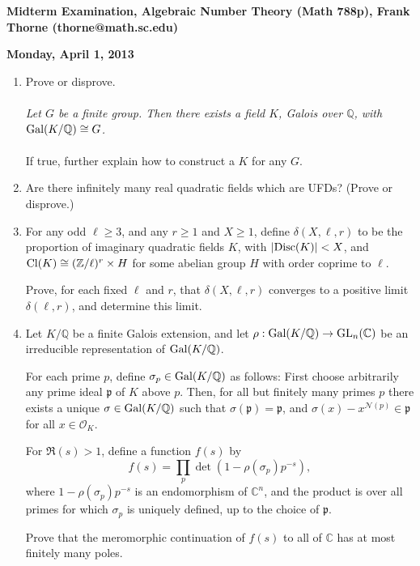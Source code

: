 \documentclass[12pt]{article}
\newcommand{\Gal}{{\text {\rm Gal}}}
\newcommand{\Disc}{{\text {\rm Disc}}}
\newcommand{\GL}{{\text {\rm GL}}}
\newcommand{\Cl}{{\text {\rm Cl}}}
\newcommand{\Q}{\mathbb{Q}}
\newcommand{\Z}{\mathbb{Z}}
\newcommand{\C}{\mathbb{C}}
\newcommand{\mfp}{\mathfrak{p}}
\newcommand{\calN}{\mathcal{N}}
\begin{document}
\setlength{\topmargin}{-2mm}





\begin{center}{\bf Midterm Examination, Algebraic Number Theory (Math 788p), Frank Thorne (thorne@math.sc.edu)}
\end{center}
\begin{center}
{\bf Monday, April 1, 2013}
\end{center}

\begin{enumerate}[(1)]
\item
Prove or disprove.
\\
\\
{\itshape Let $G$ be a finite group. Then there exists a field $K$, Galois over $\Q$, with $\Gal(K/\Q) \cong G$.}
\\
\\
If true, further explain how to construct a $K$ for any $G$.
\vskip 0.5in
\item
Are there infinitely many real quadratic fields which are UFDs? (Prove or disprove.)
\vskip 0.5in
\item
For any odd $\ell \geq 3$, and any $r \geq 1$ and $X \geq 1$, define $\delta(X, \ell, r)$ to be the proportion
of imaginary quadratic fields $K$, with $|\Disc(K)| < X$, and $\Cl(K) \cong (\Z/\ell)^r \times H$
for some abelian group $H$ with order coprime to $\ell$.

Prove, for each fixed $\ell$ and $r$, that $\delta(X, \ell, r)$ converges to a positive 
limit $\delta(\ell, r)$, and determine this limit.
\vskip 0.5in
\item
Let $K/\Q$ be a finite Galois extension, and let $\rho: \Gal(K/\Q) \rightarrow \GL_n(\C)$ be an irreducible
representation of $\Gal(K/\Q)$.

For each prime $p$, define $\sigma_p \in \Gal(K/\Q)$ as follows: First choose arbitrarily any prime ideal $\mfp$
of $K$ above $p$. Then, for all but finitely many primes $p$ there exists a unique $\sigma \in \Gal(K/\Q)$ such that
$\sigma(\mfp) = \mfp$, and $\sigma(x) - x^{\calN(p)} \in \mfp$ for all $x \in \mathcal{O}_K$.

For $\Re(s) > 1$, define a function $f(s)$ by
\[ f(s) = \prod_p \det(1 - \rho(\sigma_p) p^{-s}),
\]
where $1 - \rho(\sigma_p) p^{-s}$ is an endomorphism of $\C^n$, and the product is over all primes for which $\sigma_p$ is uniquely
defined, up to the choice of $\mfp$.

Prove that the meromorphic continuation of $f(s)$ to all of $\C$ has at most finitely many poles.

\end{enumerate}
\end{document}
